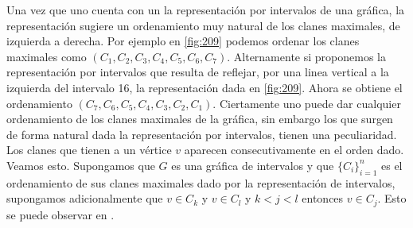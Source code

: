 Una vez que uno cuenta con un la representación por intervalos de una gráfica, la representación sugiere un ordenamiento muy natural de los clanes maximales, de izquierda a derecha. Por ejemplo en \cref{fig:209} podemos ordenar los clanes maximales como $(C_1,C_2, C_3, C_4, C_5, C_6, C_7)$. Alternamente si proponemos la representación por intervalos que resulta de reflejar, por una linea vertical a la izquierda del intervalo 16, la representación dada en \cref{fig:209}. Ahora se obtiene el ordenamiento $(C_7,C_6,C_5,C_4,C_3,C_2,C_1)$. Ciertamente uno puede dar cualquier ordenamiento de los clanes maximales de la gráfica, sin embargo los que surgen de forma natural dada la representación por intervalos, tienen una peculiaridad. Los clanes que tienen a un vértice $v$ aparecen consecutivamente en el orden dado. Veamos esto. Supongamos que $G$ es una gráfica de intervalos y que $\{C_i\}_{i=1} ^n$ es el ordenamiento de sus clanes maximales dado por la representación de intervalos, supongamos adicionalmente que $v\in C_k$ y $v\in C_l$ y $k<j<l$ entonces $v\in C_j$. Esto se puede observar en . 



